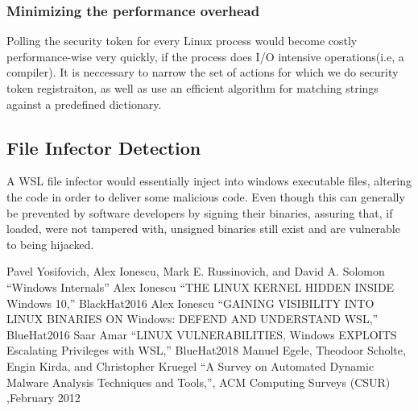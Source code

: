 \documentclass[conference]{IEEEtran}
\begin{document}
    \subsubsection{Minimizing the performance overhead}
    Polling the security token for every Linux process would become costly performance-wise very quickly, if the process does I/O
    intensive operations(i.e, a compiler). It is neccessary to narrow the set of actions for which we do security token registraiton, as well
    as use an efficient algorithm for matching strings against a predefined dictionary.\\

    \pagebreak
    
    \subsection{File Infector Detection}
    A WSL file infector would essentially inject into windows executable files, altering the code in order to deliver some malicious
    code. Even though this can generally be prevented by software developers by signing their binaries, assuring that, if loaded, were
    not tampered with, unsigned binaries still exist and are vulnerable to being hijacked.



\begin{thebibliography}{00}
 Pavel Yosifovich, Alex Ionescu, Mark E. Russinovich, and  David A. Solomon ``Windows Internals''
 Alex Ionescu ``THE LINUX KERNEL HIDDEN INSIDE Windows 10,'' BlackHat2016
 Alex Ionescu ``GAINING VISIBILITY INTO LINUX BINARIES ON Windows: DEFEND AND UNDERSTAND WSL,'' BlueHat2016
 Saar Amar ``LINUX VULNERABILITIES, Windows EXPLOITS Escalating Privileges with WSL,'' BlueHat2018
 Manuel Egele, Theodoor Scholte, Engin Kirda, and Christopher Kruegel ``A Survey on Automated Dynamic Malware Analysis Techniques and Tools,'', ACM Computing Surveys (CSUR) ,February 2012
\end{thebibliography}
\end{document}
